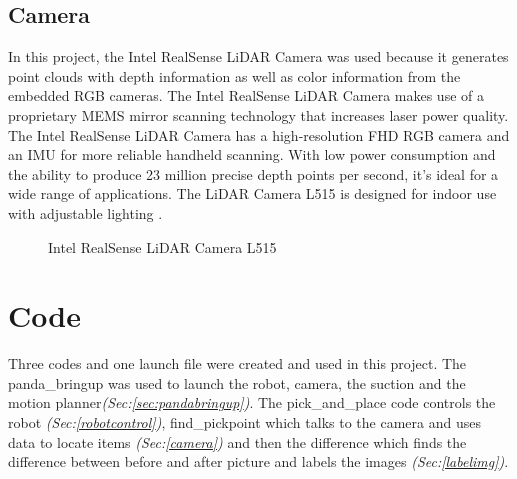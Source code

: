 \subsection{Camera\label{subsec:camera}} 
In this project, the Intel RealSense LiDAR Camera was used because it generates point clouds with depth information as well as color information from the embedded RGB cameras. The Intel RealSense LiDAR Camera makes use of a proprietary MEMS mirror scanning technology that increases laser power quality. The Intel RealSense LiDAR Camera has a high-resolution FHD RGB camera and an IMU for more reliable handheld scanning. With low power consumption and the ability to produce 23 million precise depth points per second, it's ideal for a wide range of applications. The LiDAR Camera L515 is designed for indoor use with adjustable lighting \cite{noauthor_intel_nodate}.
\begin{figure}[h]
    \centering
    \hfill
    \caption{Intel RealSense LiDAR Camera L515 \cite{noauthor_intel_nodate}}
    \label{figure: lidar}
\end{figure}


\section{Code}
Three codes and one launch file were created and used in this project. The panda\_bringup was used to launch the robot, camera, the suction and the motion planner\textit{(Sec:\ref{sec:pandabringup})}. 
The pick\_and\_place code controls the robot \textit{(Sec:\ref{robotcontrol})}, find\_pickpoint which talks to the camera and uses data to locate items \textit{(Sec:\ref{camera})} and then the difference which finds the difference between before and after picture and labels the images \textit{(Sec:\ref{labelimg})}.

